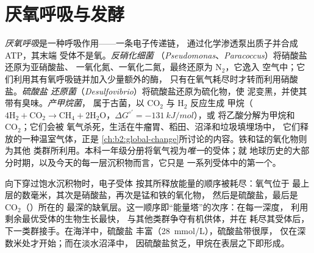 \section{厌氧呼吸与发酵}

\begin{definition}[厌氧呼吸]\label{def:b2:microbial-metabolism:anaerobic}
\emph{厌氧呼吸}是一种呼吸作用——一条电子传递链，
通过化学渗透泵出质子并合成 ATP，其末端
受体不是氧。\emph{反硝化细菌}
（\emph{Pseudomonas}、\emph{Paracoccus}）将硝酸盐还原为亚硝酸盐、
一氧化氮、一氧化二氮，最终还原为 $\mathrm{N_2}$，它逸入
空气中；它们利用其有氧呼吸链并加入少量额外的酶，
只有在氧气耗尽时才转而利用硝酸盐。\emph{硫酸盐
还原菌}（\emph{Desulfovibrio}）将硫酸盐还原为硫化物，使
泥变黑，并使其带有臭味。\emph{产甲烷菌}，
属于古菌，以 $\mathrm{CO_2}$ 与 $\mathrm{H_2}$ 反应生成
甲烷（$4\mathrm{H_2} + \mathrm{CO_2} \to \mathrm{CH_4} +
2\mathrm{H_2O}$，$\Delta G^{\circ\prime} = \qty{-131}{kJ/mol}$），或
将乙酸分解为甲烷和 $\mathrm{CO_2}$；它们会被
氧气杀死，生活在牛瘤胃、稻田、沼泽和垃圾填埋场中，
它们释放的一种温室气体，正是
\cref{ch:b2:global-change}所讨论的内容。铁和锰的氧化物则为其他
类群所利用。本科一年级分册将氧气视为\emph{唯一}的受体；就
地球历史的大部分时期，以及今天的每一层沉积物而言，它只是
一系列受体中的第一个。
\end{definition}

\begin{proposition}[沉积物中电子受体的顺序]\label{prop:b2:microbial-metabolism:sequence}
向下穿过饱水沉积物时，电子受体
按其所释放能量的顺序被耗尽：氧气位于
最上层的数毫米，其次是硝酸盐，再次是锰和铁的氧化物，
然后是硫酸盐，最后是 $\mathrm{CO_2}$（）所在的
最深的缺氧层。这一顺序即“能量塔”的次序：在每一深度，
利用剩余最优受体的生物生长最快，
与其他类群争夺有机供体，并在
耗尽其受体后，下一类群接手。在海洋中，硫酸盐
丰富（\qty{28}{mmol/L}），硫酸盐带很厚，
仅在深数米处才开始；而在淡水沼泽中，
因硫酸盐贫乏，甲烷在表层之下即形成。
\end{proposition}

